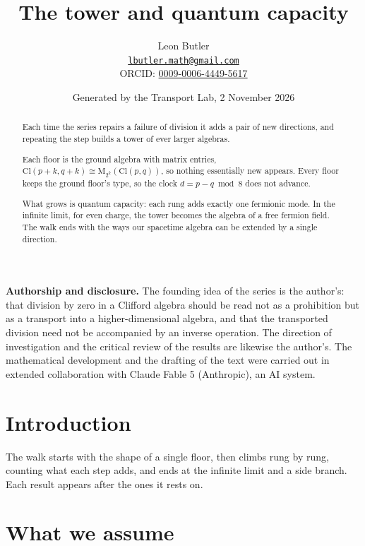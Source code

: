 \documentclass[11pt]{article}
\title{\bfseries The tower and quantum capacity}
\author{Leon Butler\\ \normalsize\href{mailto:lbutler.math@gmail.com}{\texttt{lbutler.math@gmail.com}}\\ \normalsize ORCID: \href{https://orcid.org/0009-0006-4449-5617}{0009-0006-4449-5617}}
\date{Generated by the Transport Lab, 2 November 2026}
\theoremstyle{definition}
\theoremstyle{plain}
\providecommand{\Cl}{}\renewcommand{\Cl}{\mathrm{Cl}}
\providecommand{\Mat}{}\renewcommand{\Mat}{\mathrm{M}}
\begin{document}
\maketitle
\begin{abstract}
\normalsize
Each time the series repairs a failure of division it adds a pair of new directions, and repeating the step builds a tower of ever larger algebras.

Each floor is the ground algebra with matrix entries, $\Cl(p{+}k, q{+}k) \cong \Mat_{2^k}(\Cl(p,q))$, so nothing essentially new appears. Every floor keeps the ground floor's type, so the clock $d = p - q \bmod 8$ does not advance.

What grows is quantum capacity: each rung adds exactly one fermionic mode. In the infinite limit, for even charge, the tower becomes the algebra of a free fermion field. The walk ends with the ways our spacetime algebra can be extended by a single direction.
\end{abstract}
\newpage
\noindent \textbf{Authorship and disclosure. }The founding idea of the series is the author's: that division by zero in a Clifford algebra should be read not as a prohibition but as a transport into a higher-dimensional algebra, and that the transported division need not be accompanied by an inverse operation. The direction of investigation and the critical review of the results are likewise the author's. The mathematical development and the drafting of the text were carried out in extended collaboration with Claude Fable 5 (Anthropic), an AI system.

\noindent{}
\newpage

\section*{Introduction}
The walk starts with the shape of a single floor, then climbs rung by rung, counting what each step adds, and ends at the infinite limit and a side branch. Each result appears after the ones it rests on.

\section{What we assume}
\end{document}
